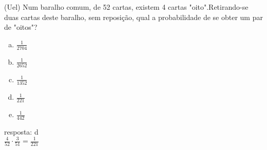 \begin{ex}
 (Uel) Num baralho comum, de 52 cartas, existem 4 cartas "oito".Retirando-se duas cartas deste baralho, sem reposição, qual a probabilidade de se obter um par de "oitos"?
    \begin{enumerate}[(a)]
    \item $\frac{1}{2704}$
    \item $\frac{1}{2652}$
    \item $\frac{1}{1352}$
    \item $\frac{1}{221}$
    \item $\frac{1}{442}$
    \end{enumerate}
      \begin{sol}
        resposta: d \\
        $\frac{4}{52}\cdot\frac{3}{51}=\frac{1}{221}$
      \end{sol}
\end{ex}